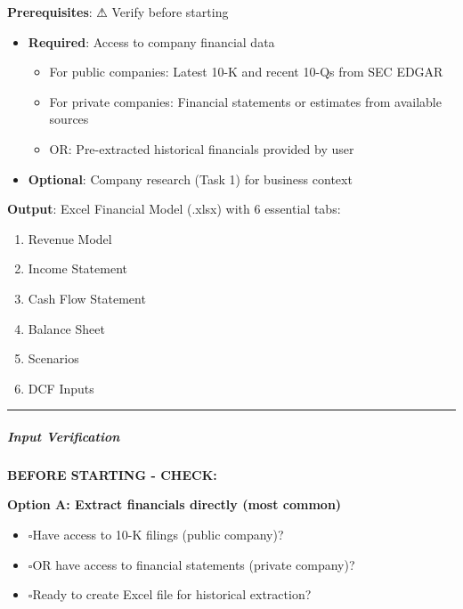 \documentclass[11pt]{article}
\newcommand{\UncheckedBox}{$\square$}
\begin{document}
\textbf{Prerequisites}: ⚠ Verify before starting

\begin{itemize}[leftmargin=*,itemsep=2pt,topsep=2pt]
\item {} \textbf{Required}: Access to company financial data
\begin{itemize}[leftmargin=*,itemsep=2pt,topsep=2pt]
\item {} For public companies: Latest 10-K and recent 10-Qs from SEC EDGAR
\item {} For private companies: Financial statements or estimates from available sources
\item {} OR: Pre-extracted historical financials provided by user
\end{itemize}
\item {} \textbf{Optional}: Company research (Task 1) for business context
\end{itemize}

\textbf{Output}: Excel Financial Model (.xlsx) with 6 essential tabs:

\begin{enumerate}[leftmargin=*,itemsep=2pt,topsep=2pt]
\item {} Revenue Model
\item {} Income Statement
\item {} Cash Flow Statement
\item {} Balance Sheet
\item {} Scenarios
\item {} DCF Inputs
\end{enumerate}

\vspace{0.5em}\hrule\vspace{0.5em}

\subparagraph{Input Verification}\mbox{}\par

\textbf{BEFORE STARTING - CHECK:}


\textbf{Option A: Extract financials directly (most common)}

\begin{itemize}[leftmargin=*,itemsep=2pt,topsep=2pt]
\item {} \UncheckedBox Have access to 10-K filings (public company)?
\item {} \UncheckedBox OR have access to financial statements (private company)?
\item {} \UncheckedBox Ready to create Excel file for historical extraction?
\end{itemize}
\end{document}
